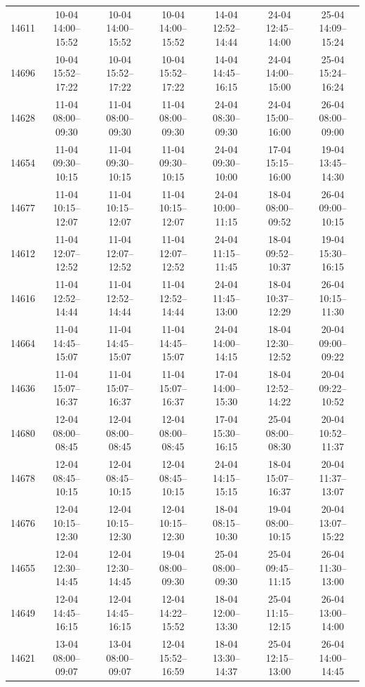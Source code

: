 \begin{table}[htbp]
\begin{tabular}{|r|c|c|c|c|c|c|}
14611 & 10-04 14:00--15:52 & 10-04 14:00--15:52 & 10-04 14:00--15:52 & 14-04 12:52--14:44 & 24-04 12:45--14:00 & 25-04 14:09--15:24 \\ 
14696 & 10-04 15:52--17:22 & 10-04 15:52--17:22 & 10-04 15:52--17:22 & 14-04 14:45--16:15 & 24-04 14:00--15:00 & 25-04 15:24--16:24 \\ 
14628 & 11-04 08:00--09:30 & 11-04 08:00--09:30 & 11-04 08:00--09:30 & 24-04 08:30--09:30 & 24-04 15:00--16:00 & 26-04 08:00--09:00 \\ 
14654 & 11-04 09:30--10:15 & 11-04 09:30--10:15 & 11-04 09:30--10:15 & 24-04 09:30--10:00 & 17-04 15:15--16:00 & 19-04 13:45--14:30 \\ 
14677 & 11-04 10:15--12:07 & 11-04 10:15--12:07 & 11-04 10:15--12:07 & 24-04 10:00--11:15 & 18-04 08:00--09:52 & 26-04 09:00--10:15 \\ 
14612 & 11-04 12:07--12:52 & 11-04 12:07--12:52 & 11-04 12:07--12:52 & 24-04 11:15--11:45 & 18-04 09:52--10:37 & 19-04 15:30--16:15 \\ 
14616 & 11-04 12:52--14:44 & 11-04 12:52--14:44 & 11-04 12:52--14:44 & 24-04 11:45--13:00 & 18-04 10:37--12:29 & 26-04 10:15--11:30 \\ 
14664 & 11-04 14:45--15:07 & 11-04 14:45--15:07 & 11-04 14:45--15:07 & 24-04 14:00--14:15 & 18-04 12:30--12:52 & 20-04 09:00--09:22 \\ 
14636 & 11-04 15:07--16:37 & 11-04 15:07--16:37 & 11-04 15:07--16:37 & 17-04 14:00--15:30 & 18-04 12:52--14:22 & 20-04 09:22--10:52 \\ 
14680 & 12-04 08:00--08:45 & 12-04 08:00--08:45 & 12-04 08:00--08:45 & 17-04 15:30--16:15 & 25-04 08:00--08:30 & 20-04 10:52--11:37 \\ 
14678 & 12-04 08:45--10:15 & 12-04 08:45--10:15 & 12-04 08:45--10:15 & 24-04 14:15--15:15 & 18-04 15:07--16:37 & 20-04 11:37--13:07 \\ 
14676 & 12-04 10:15--12:30 & 12-04 10:15--12:30 & 12-04 10:15--12:30 & 18-04 08:15--10:30 & 19-04 08:00--10:15 & 20-04 13:07--15:22 \\ 
14655 & 12-04 12:30--14:45 & 12-04 12:30--14:45 & 19-04 08:00--09:30 & 25-04 08:00--09:30 & 25-04 09:45--11:15 & 26-04 11:30--13:00 \\ 
14649 & 12-04 14:45--16:15 & 12-04 14:45--16:15 & 12-04 14:22--15:52 & 18-04 12:00--13:30 & 25-04 11:15--12:15 & 26-04 13:00--14:00 \\ 
14621 & 13-04 08:00--09:07 & 13-04 08:00--09:07 & 12-04 15:52--16:59 & 18-04 13:30--14:37 & 25-04 12:15--13:00 & 26-04 14:00--14:45 \\ 

\end{tabular}
\end{table}

